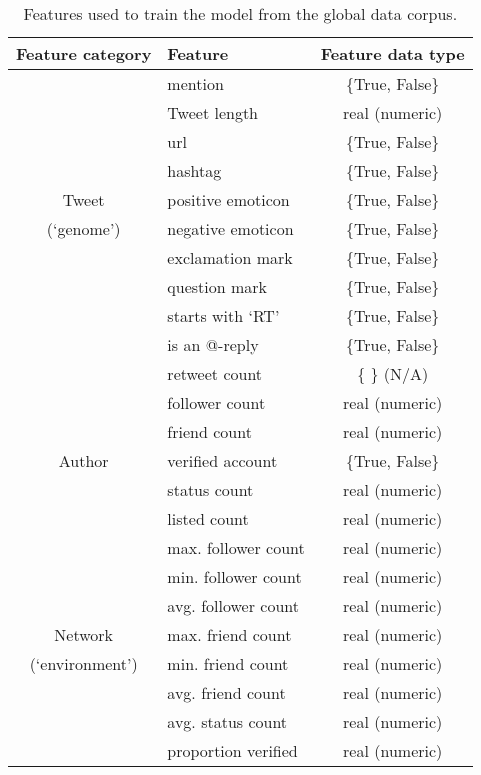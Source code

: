 \begin{table}[h]\footnotesize
\begin{center}
\begin{tabular}{ c | l | c }
	 Feature category	& Feature & Feature data type \\
	 \hline
	 \hline 
	& mention & \{True, False\}\\
    & Tweet length & real (numeric)\\
    & url & \{True, False\}\\
  	& hashtag & \{True, False\}\\
  	Tweet & positive emoticon & \{True, False\}\\
  	(`genome')& negative emoticon & \{True, False\}\\
  	& exclamation mark & \{True, False\}\\
  	& question mark & \{True, False\}\\
  	& starts with `RT' & \{True, False\}\\
  	& is an @-reply & \{True, False\}\\
    & retweet count & \{ \} (N/A)\\
  \hline                        
	& follower count & real (numeric)\\
    & friend count  & real (numeric)\\
	Author & verified account & \{True, False\}\\
	& status count & real (numeric)\\
	& listed count & real (numeric)\\
    \hline
  	&  max. follower count & real (numeric)\\
	&  min. follower count & real (numeric)\\
	& avg. follower count & real (numeric)\\
    Network & max. friend count & real (numeric)\\
	(`environment') & min. friend count & real (numeric)\\
	& avg. friend count & real (numeric)\\  
	& avg. status count & real (numeric)\\  
  	& proportion verified & real (numeric)\\  
  \hline  
\end{tabular}
\end{center}
\caption{Features used to train the model from the global data corpus.}
\label{table:globalfeatures}
\end{table}

